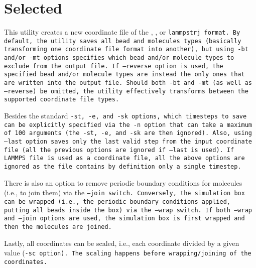 \section{Selected} \label{sec:Selected}

This utility creates a new coordinate file of the \xyz, \vtcf, or \tt{lammpstrj}
format. By default, the utility saves all bead and molecules types (basically
transforming one coordinate file format into another), but using \tt{-bt} and/or
\tt{-mt} options specifies which bead and/or molecule types to exclude from the
output file. If \tt{--reverse} option is used, the specified bead and/or
molecule types are instead the only ones that are written into the output file.
Should both \tt{-bt} and \tt{-mt} (as well as \tt{--reverse}) be omitted, the
utility effectively transforms between the supported coordinate file types.

Besides the standard \tt{-st}, \tt{-e}, and \tt{-sk} options, which timesteps to
save can be explicitly specified via the \tt{-n} option that can take a maximum
of 100 arguments (the \tt{-st}, \tt{-e}, and \tt{-sk} are then ignored). Also,
using \tt{--last} option saves only the last valid step from the input
coordinate file (all the previous options are ignored if \tt{--last} is used).
If LAMMPS \data file is used as a coordinate file, all the above options are
ignored as the \data file contains by definition only a single timestep.

There is also an option to remove periodic boundary conditions for molecules
(i.e., to join them) via the \tt{--join} switch. Conversely, the simulation box
can be wrapped (i.e., the periodic boundary conditions applied, putting all
beads inside the box) via the \tt{--wrap} switch. If both \tt{--wrap} and
\tt{--join} options are used, the simulation box is first wrapped and then the
molecules are joined.

Lastly, all coordinates can be scaled, i.e., each coordinate divided by a given
value (\tt{-sc} option). The scaling happens before wrapping/joining of the
coordinates.

